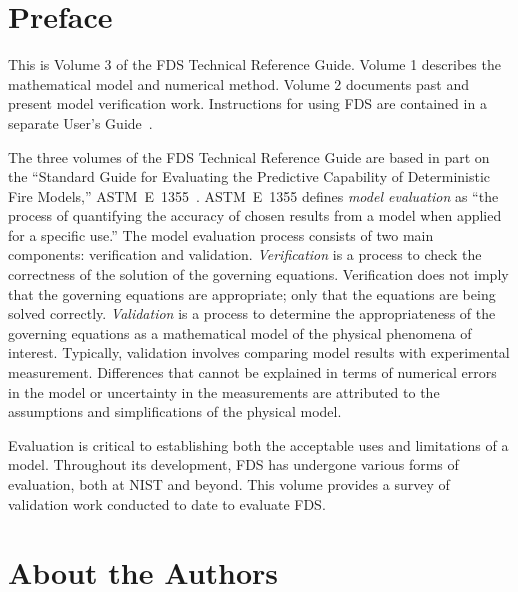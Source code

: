 \documentclass[11pt]{book}
\begin{document}
\pagestyle{plain}


\chapter{Preface}

This is Volume 3 of the FDS Technical Reference Guide. Volume 1 describes the mathematical model and numerical method. Volume 2 documents past and
present model verification work. Instructions for using FDS are contained in a separate User's Guide~\cite{FDS_Users_Guide_5}.

The three volumes of the FDS Technical Reference Guide are based in part on the ``Standard Guide for Evaluating the Predictive Capability of
Deterministic Fire Models,'' ASTM~E~1355~\cite{ASTM:E1355}. ASTM~E~1355 defines {\em model evaluation} as ``the process of quantifying the accuracy
of chosen results from a model when applied for a specific use.'' The model evaluation process consists of two main components: verification and
validation. {\em Verification} is a process to check the correctness of the solution of the governing equations. Verification does not imply that the
governing equations are appropriate; only that the equations are being solved correctly. {\em Validation} is a process to determine the
appropriateness of the governing equations as a mathematical model of the physical phenomena of interest. Typically, validation involves comparing
model results with experimental measurement. Differences that cannot be explained in terms of numerical errors in the model or uncertainty in the
measurements are attributed to the assumptions and simplifications of the physical model.

Evaluation is critical to establishing both the acceptable uses and limitations of a model. Throughout its development, FDS has undergone various
forms of evaluation, both at NIST and beyond. This volume provides a survey of validation work conducted to date to evaluate FDS.


\chapter{About the Authors}
\end{document}
